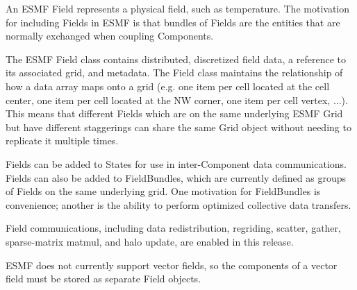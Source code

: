 
An ESMF Field represents a physical field, such as temperature.
The motivation for including Fields in ESMF is that bundles of 
Fields are the entities that are normally exchanged when coupling
Components.  

The ESMF Field class contains distributed, discretized field data, a reference 
to its associated grid, and metadata.  The Field class maintains the
relationship of how a data array maps onto a grid (e.g. one item per
cell located at the cell center, one item per cell located at the NW
corner,  one item per cell vertex, ...).  This means that different Fields
which are on the same underlying ESMF Grid but have different
staggerings can share the same Grid object without needing to replicate
it multiple times. 

Fields can be added to States for use in inter-Component
data communications.  Fields can also be added to FieldBundles,
which are currently defined as groups of Fields on the same underlying
grid.  One motivation for FieldBundles is convenience; another is the
ability to perform optimized collective data transfers.  

Field communications, including data redistribution, regriding, scatter,
gather, sparse-matrix matmul, and halo update, are enabled in this release.

ESMF does not currently support vector fields, so the components of 
a vector field must be stored as separate Field objects.  


